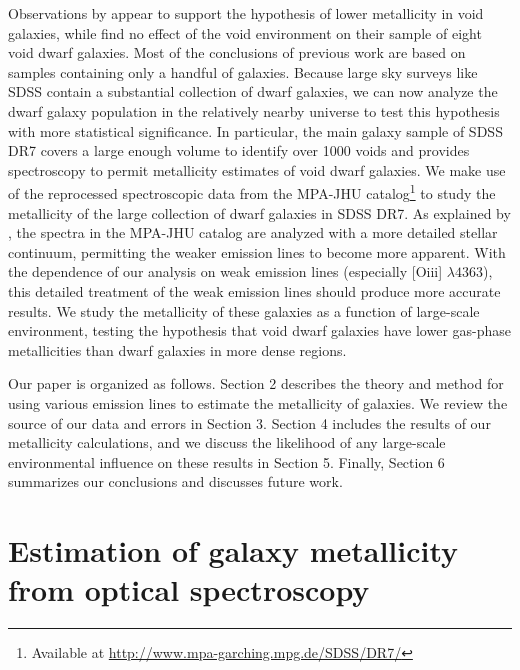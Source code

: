 Observations by \cite{Cooper08, Deng11, Filho15, Pustilnik06, Pustilnik11a, 
Pustilnik11b, Pustilnik13, Pustilnik14} appear to support the hypothesis of 
lower metallicity in void galaxies, while \cite{Kreckel15} find no effect of the 
void environment on their sample of eight void dwarf galaxies.  Most of the 
conclusions of previous work are based on samples containing only a handful of 
galaxies.  Because large sky surveys like SDSS contain a substantial collection 
of dwarf galaxies, we can now analyze the dwarf galaxy population in the 
relatively nearby universe to test this hypothesis with more statistical 
significance.  In particular, the main galaxy sample of SDSS DR7 covers a large 
enough volume to identify over 1000 voids \citep{Pan12} and provides 
spectroscopy to permit metallicity estimates of void dwarf galaxies.  We make 
use of the reprocessed spectroscopic data from the MPA-JHU 
catalog\footnote{Available at \url{http://www.mpa-garching.mpg.de/SDSS/DR7/}} to 
study the metallicity of the large collection of dwarf galaxies in SDSS DR7.  As 
explained by \cite{Tremonti04}, the spectra in the MPA-JHU catalog are analyzed 
with a more detailed stellar continuum, permitting the weaker emission lines to 
become more apparent.  With the dependence of our analysis on weak emission 
lines (especially [O{\sc iii}] $\lambda 4363$), this detailed treatment of the 
weak emission lines should produce more accurate results.  We study the 
metallicity of these galaxies as a function of large-scale environment, testing 
the hypothesis that void dwarf galaxies have lower gas-phase metallicities than 
dwarf galaxies in more dense regions.

Our paper is organized as follows.  Section 2 describes the theory and method 
for using various emission lines to estimate the metallicity of galaxies.  We 
review the source of our data and errors in Section 3.   Section 4 includes the 
results of our metallicity calculations, and we discuss the likelihood of any 
large-scale environmental influence on these results in Section 5.  Finally, 
Section 6 summarizes our conclusions and discusses future work.



\section[Theory]{Estimation of galaxy metallicity from optical spectroscopy}
\label{sec:Theory_P1}

